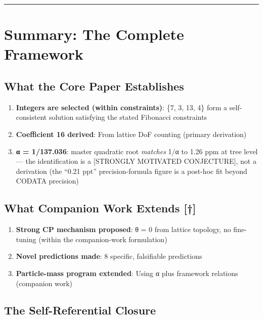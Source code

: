 \documentclass[
  11pt,
  letterpaper,
  twoside,
  openany]{book}
\makeatletter
\providecommand{\tightlist}{%
  \setlength{\itemsep}{0pt}\setlength{\parskip}{0pt}}
\let\orig@section\section
\renewcommand{\section}{\needspace{8\baselineskip}\orig@section}
\let\orig@subsection\subsection
\renewcommand{\subsection}{\needspace{6\baselineskip}\orig@subsection}
\makeatother
\begin{document}
\begin{center}\rule{0.5\linewidth}{0.5pt}\end{center}

\section{Summary: The Complete
Framework}\label{summary-the-complete-framework}

\subsection{What the Core Paper
Establishes}\label{what-the-core-paper-establishes}

\begin{enumerate}
\def\labelenumi{\arabic{enumi}.}
\tightlist
\item
  \textbf{Integers are selected (within constraints)}: \{7, 3, 13, 4\}
  form a self-consistent solution satisfying the stated Fibonacci
  constraints
\item
  \textbf{Coefficient 16 derived}: From lattice DoF counting (primary
  derivation)
\item
  \textbf{α = 1/137.036}: master quadratic root \emph{matches} 1/α to
  1.26 ppm at tree level --- the identification is a {[}STRONGLY
  MOTIVATED CONJECTURE{]}, not a derivation (the ``0.21 ppt''
  precision-formula figure is a post-hoc fit beyond CODATA precision)
\end{enumerate}

\subsection{What Companion Work Extends
{[}†{]}}\label{what-companion-work-extends}

\begin{enumerate}
\def\labelenumi{\arabic{enumi}.}
\tightlist
\item
  \textbf{Strong CP mechanism proposed}: θ = 0 from lattice topology, no
  fine-tuning (within the companion-work formulation)
\item
  \textbf{Novel predictions made}: 8 specific, falsifiable predictions
\item
  \textbf{Particle-mass program extended}: Using α plus framework
  relations (companion work)
\end{enumerate}

\subsection{The Self-Referential
Closure}\label{the-self-referential-closure}
\end{document}
